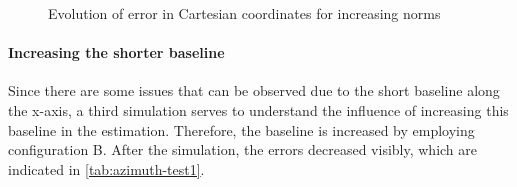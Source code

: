 \begin{figure}[!htbp]
	\captionsetup{justification=centering,margin=2cm}
	\caption{Evolution of error in Cartesian coordinates for increasing norms}
	\label{fig:cart-range}
\end{figure}

\paragraph{Increasing the shorter baseline} Since there are some issues that can be observed due to the short baseline along the x-axis, a third simulation serves to understand the influence of increasing this baseline in the estimation. Therefore, the baseline is increased by employing configuration B. After the simulation, the errors decreased visibly, which are indicated in \ref{tab:azimuth-test1}.

\paragraph{}

%	

